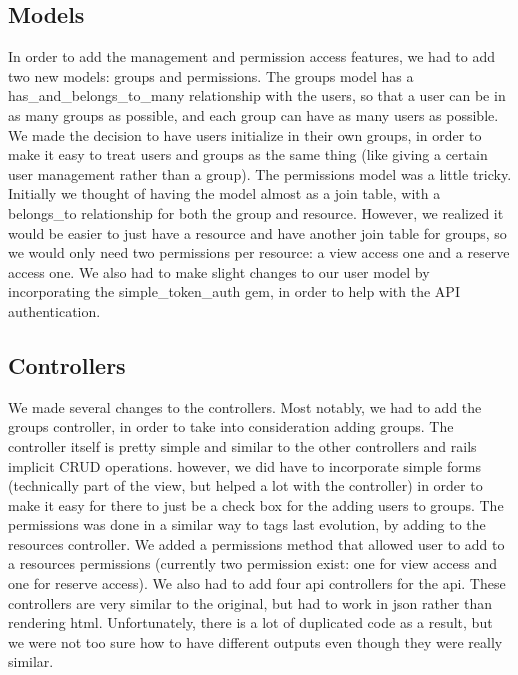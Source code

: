 \documentclass{article}
\begin{document}
\subsection{Models}
In order to add the management and permission access features, we had to add two new models: groups and permissions. The groups model has a has\_and\_belongs\_to\_many relationship with the users, so that a user can be in as many groups as possible, and each group can have as many users as possible. We made the decision to have users initialize in their own groups, in order to make it easy to treat users and groups as the same thing (like giving a certain user management rather than a group). The permissions model was a little tricky. Initially we thought of having the model almost as a join table, with a belongs\_to relationship for both the group and resource. However, we realized it would be easier to just have a resource and have another join table for groups, so we would only need two permissions per resource: a view access one and a reserve access one. We also had to make slight changes to our user model by incorporating the simple\_token\_auth gem, in order to help with the API authentication.

\subsection{Controllers}
We made several changes to the controllers. Most notably, we had to add the groups controller, in order to take into consideration adding groups. The controller itself is pretty simple and similar to the other controllers and rails implicit CRUD operations. however, we did have to incorporate simple forms (technically part of the view, but helped a lot with the controller) in order to make it easy for there to just be a check box for the adding users to groups. The permissions was done in a similar way to tags last evolution, by adding to the resources controller. We added a permissions method that allowed user to add to a resources permissions (currently two permission exist: one for view access and one for reserve access). We also had to add four api controllers for the api. These controllers are very similar to the original, but had to work in json rather than rendering html. Unfortunately, there is a lot of duplicated code as a result, but we were not too sure how to have different outputs even though they were really similar. 
\end{document}

